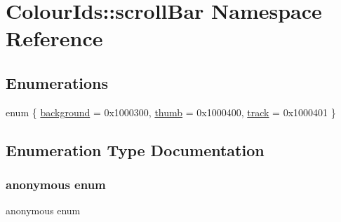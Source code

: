 \hypertarget{namespaceColourIds_1_1scrollBar}{}\section{Colour\+Ids\+:\+:scroll\+Bar Namespace Reference}
\label{namespaceColourIds_1_1scrollBar}
\subsection*{Enumerations}
\begin{DoxyCompactItemize}
\item 
enum \{ \mbox{\hyperlink{namespaceColourIds_1_1scrollBar_ab11a1ced68ac61ab089574577358808fadfd93c658bbec29d3141f4f30bfd8201}{background}} = 0x1000300, 
\mbox{\hyperlink{namespaceColourIds_1_1scrollBar_ab11a1ced68ac61ab089574577358808fa20a3bb79847d67033b40ee25ca3f8220}{thumb}} = 0x1000400, 
\mbox{\hyperlink{namespaceColourIds_1_1scrollBar_ab11a1ced68ac61ab089574577358808fa5c643a16a4e3bd4940f394456a53169f}{track}} = 0x1000401
 \}
\end{DoxyCompactItemize}


\subsection{Enumeration Type Documentation}
\mbox{\label{namespaceColourIds_1_1scrollBar_ab11a1ced68ac61ab089574577358808f}} 
\subsubsection{\texorpdfstring{anonymous enum}{anonymous enum}}
{\footnotesize\ttfamily anonymous enum}

